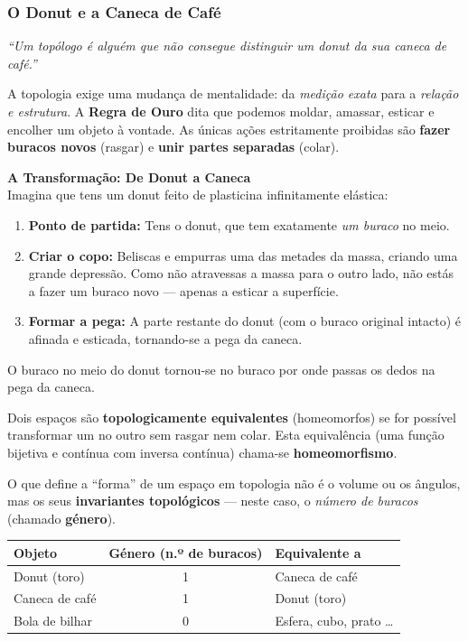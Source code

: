 \subsubsection*{O Donut e a Caneca de Café}

\begin{center}
  \textit{``Um topólogo é alguém que não consegue distinguir um donut da sua caneca de café.''}
\end{center}

A topologia exige uma mudança de mentalidade: da \emph{medição exata} para a \emph{relação e estrutura}. A \textbf{Regra de Ouro} dita que podemos moldar, amassar, esticar e encolher um objeto à vontade. As únicas ações estritamente proibidas são \textbf{fazer buracos novos} (rasgar) e \textbf{unir partes separadas} (colar).

\textbf{A Transformação: De Donut a Caneca} \\
Imagina que tens um donut feito de plasticina infinitamente elástica:
\begin{enumerate}
  \item \textbf{Ponto de partida:} Tens o donut, que tem exatamente \emph{um buraco} no meio.
  \item \textbf{Criar o copo:} Beliscas e empurras uma das metades da massa, criando uma grande depressão. Como não atravessas a massa para o outro lado, não estás a fazer um buraco novo — apenas a esticar a superfície.
  \item \textbf{Formar a pega:} A parte restante do donut (com o buraco original intacto) é afinada e esticada, tornando-se a pega da caneca.
\end{enumerate}
O buraco no meio do donut tornou-se no buraco por onde passas os dedos na pega da caneca.

\begin{defbox}[title={Homeomorfismo}]
  Dois espaços são \textbf{topologicamente equivalentes} (homeomorfos) se for possível transformar um no outro sem rasgar nem colar. Esta equivalência (uma função bijetiva e contínua com inversa contínua) chama-se \textbf{homeomorfismo}.
\end{defbox}

O que define a ``forma'' de um espaço em topologia não é o volume ou os ângulos, mas os seus \textbf{invariantes topológicos} — neste caso, o \emph{número de buracos} (chamado \textbf{género}).

\begin{center}
  \renewcommand{\arraystretch}{1.4}
  \begin{tabular}{lcl}
    \toprule
    \textbf{Objeto} & \textbf{Género (n.º de buracos)} & \textbf{Equivalente a} \\
    \midrule
    Donut (toro) & 1 & Caneca de café \\
    Caneca de café & 1 & Donut (toro) \\
    Bola de bilhar & 0 & Esfera, cubo, prato \ldots \\
    \bottomrule
  \end{tabular}
\end{center}


